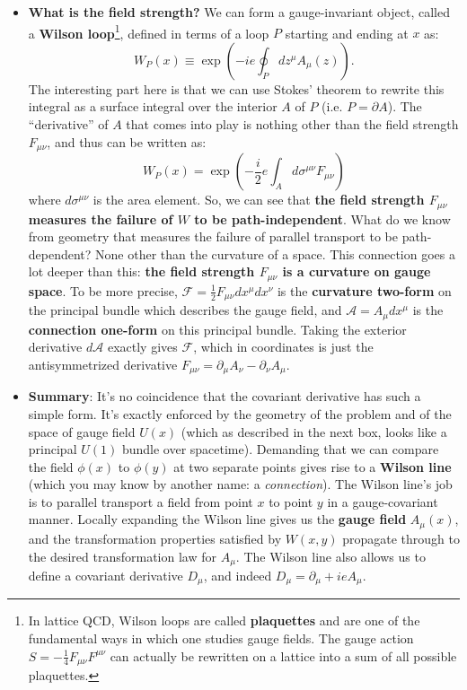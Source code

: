 \documentclass[12pt, oneside]{article}   	%
\theoremstyle{definition}
\begin{document}
\begin{itemize}
	\item \textbf{What is the field strength?} We can form a gauge-invariant object, called a \textbf{Wilson loop}\footnote{In lattice QCD, Wilson loops are called \textbf{plaquettes} and are one of the fundamental ways in which one studies gauge fields. The gauge action $S = -\frac{1}{4} F_{\mu\nu} F^{\mu\nu}$ can actually be rewritten on a lattice into a sum of all possible plaquettes. }, defined in terms of a loop $P$ starting and ending at $x$ as:
	\begin{equation}
		W_P(x)\equiv \exp\left(-ie\oint_P dz^\mu A_\mu(z)\right).
	\end{equation}
	The interesting part here is that we can use Stokes' theorem to rewrite this integral as a surface integral over the interior $A$ of $P$ (i.e. $P = \partial A$). The ``derivative'' of $A$ that comes into play is nothing other than the field strength $F_{\mu\nu}$, and thus can be written as:
	\begin{equation}
		W_P(x) = \exp\left(-\frac{i}{2} e \int_A d\sigma^{\mu\nu} F_{\mu\nu}\right)
	\end{equation}
	where $d\sigma^{\mu\nu}$ is the area element. So, we can see that \textbf{the field strength $F_{\mu\nu}$ measures the failure of $W$ to be path-independent}. What do we know from geometry that measures the failure of parallel transport to be path-dependent? None other than the curvature of a space. This connection goes a lot deeper than this: \textbf{the field strength $F_{\mu\nu}$ is a curvature on gauge space}. To be more precise, $\mathcal F = \frac{1}{2} F_{\mu\nu} dx^\mu dx^\nu$ is the \textbf{curvature two-form} on the principal bundle which describes the gauge field, and $\mathcal A = A_\mu dx^\mu$ is the \textbf{connection one-form} on this principal bundle. Taking the exterior derivative $d\mathcal A$ exactly gives $\mathcal F$, which in coordinates is just the antisymmetrized derivative $F_{\mu\nu} = \partial_\mu A_\nu - \partial_\nu A_\mu$.
	
	\item \textbf{Summary}: It's no coincidence that the covariant derivative has such a simple form. It's exactly enforced by the geometry of the problem and of the space of gauge field $U(x)$ (which as described in the next box, looks like a principal $U(1)$ bundle over spacetime). Demanding that we can compare the field $\phi(x)$ to $\phi(y)$ at two separate points gives rise to a \textbf{Wilson line} (which you may know by another name: a \textit{connection}). The Wilson line's job is to parallel transport a field from point $x$ to point $y$ in a gauge-covariant manner. Locally expanding the Wilson line gives us the \textbf{gauge field} $A_\mu(x)$, and the transformation properties satisfied by $W(x, y)$ propagate through to the desired transformation law for $A_\mu$. The Wilson line also allows us to define a covariant derivative $D_\mu$, and indeed $D_\mu = \partial_\mu + i e A_\mu$. 
	

\end{itemize}
\end{document}
